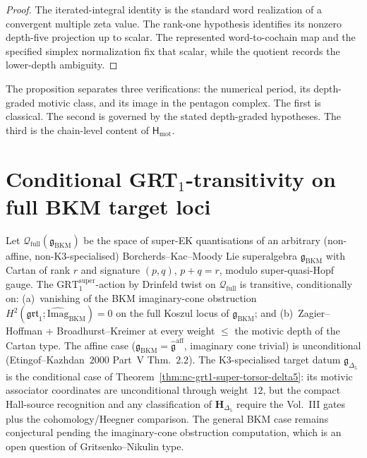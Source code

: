 \begin{proof}
The iterated-integral identity is the standard word realization of a
convergent multiple zeta value.  The rank-one hypothesis identifies its
nonzero depth-five projection up to scalar.  The represented
word-to-cochain map and the specified simplex normalization fix that
scalar, while the quotient records the lower-depth ambiguity.
\end{proof}

\begin{remark}
\label{rem:nc-phi-25-first-double-conditional}
The proposition separates three verifications: the numerical period,
its depth-graded motivic class, and its image in the pentagon complex.
The first is classical.  The second is governed by the stated
depth-graded hypotheses.  The third is the chain-level content of
\(\mathsf H_{\mathrm{mot}}\).
\end{remark}

\section{Conditional GRT$_1$-transitivity on full BKM target loci}
\label{sec:nc-grt1-full-bkm-conditional}

\begin{theorem}
\label{thm:nc-grt1-full-bkm-conditional}
\ClaimStatusConditional
Let $\mathcal Q_{\mathrm{full}}(\mathfrak g_{\mathrm{BKM}})$ be the
space of super-EK quantisations of an arbitrary \textup{(}non-affine,
non-K$3$-specialised\textup{)} Borcherds--Kac--Moody Lie superalgebra
$\mathfrak g_{\mathrm{BKM}}$ with Cartan of rank $r$ and signature
$(p, q)$, $p + q = r$, modulo super-quasi-Hopf gauge. The
$\mathrm{GRT}_1^{\mathrm{super}}$-action by Drinfeld twist on
$\mathcal Q_{\mathrm{full}}$ is transitive, conditionally on:
\textup{(a)~vanishing of the BKM imaginary-cone obstruction
$H^2(\mathfrak{grt}_1; \widehat{\mathrm{Imag}}_{\mathrm{BKM}}) = 0$
on the full Koszul locus of} $\mathfrak g_{\mathrm{BKM}}$; and
\textup{(b)~Zagier--Hoffman + Broadhurst--Kreimer at every weight
$\le$ the motivic depth of the Cartan type}. The affine case
\textup{(}$\mathfrak g_{\mathrm{BKM}} = \widehat{\mathfrak g}^{\mathrm{aff}}$,
imaginary cone trivial\textup{)} is unconditional
\textup{(}Etingof--Kazhdan~$2000$ Part~V Thm.~$2.2$\textup{)}. The
K$3$-specialised target datum $\mathfrak g_{\Delta_5}$ is the
conditional case of
Theorem~\ref{thm:nc-grt1-super-torsor-delta5}: its motivic associator
coordinates are unconditional through weight~$12$, but the compact
Hall-source recognition and any classification of
$\mathbf H_{\Delta_5}$ require the Vol.~III gates plus the
cohomology/Heegner comparison. The general BKM case remains
conjectural pending the imaginary-cone obstruction computation, which
is an open question of Gritsenko--Nikulin type.
\end{theorem}

